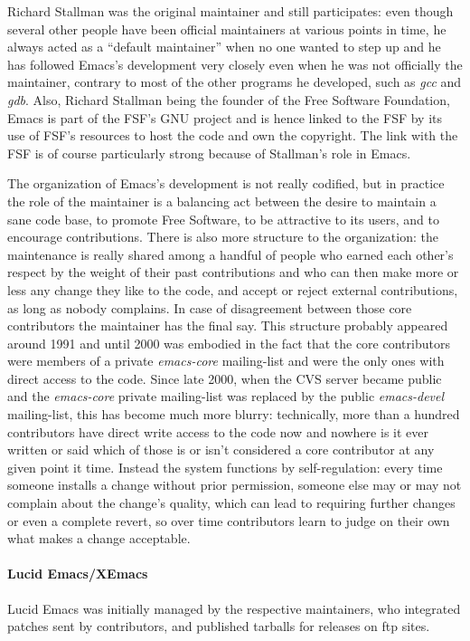 \documentclass[format=acmsmall, review]{acmart}
\begin{document}
Richard Stallman was the original maintainer and still participates: even
though several other people have been official maintainers at various points
in time, he always acted as a ``default maintainer'' when no one wanted to
step up and he has followed Emacs's development very closely even when he
was not officially the maintainer, contrary to most of the other programs he
developed, such as \emph{gcc} and \emph{gdb}.  Also, Richard Stallman being
the founder of the Free Software Foundation, Emacs is part of the FSF's GNU
project and is hence linked to the FSF by its use of FSF's resources to host
the code and own the copyright.  The link with the FSF is of course
particularly strong because of Stallman's role in Emacs.

The organization of Emacs's development is not really codified, but in
practice the role of the maintainer is a balancing act between the desire to
maintain a sane code base, to promote Free Software, to be attractive to its
users, and to encourage contributions.  There is also more structure to the
organization: the maintenance is really shared among a handful of people who
earned each other's respect by the weight of their past contributions and
who can then make more or less any change they like to the code, and accept
or reject external contributions, as long as nobody complains.  In case of
disagreement between those core contributors the maintainer has the final
say.  This structure probably appeared around 1991 and until 2000 was
embodied in the fact that the core contributors were members of a private
\emph{emacs-core} mailing-list and were the only ones with direct access to
the code.  Since late 2000, when the CVS server became public and the
\emph{emacs-core} private mailing-list was replaced by the public
\emph{emacs-devel} mailing-list, this has become much more blurry:
technically, more than a hundred contributors have direct write access to
the code now and nowhere is it ever written or said which of those is or
isn't considered a core contributor at any given point it time.  Instead the
system functions by self-regulation: every time someone installs a change
without prior permission, someone else may or may not complain about the
change's quality, which can lead to requiring further changes or even
a complete revert, so over time contributors learn to judge on their own
what makes a change acceptable.

\paragraph{Lucid Emacs/XEmacs}
Lucid Emacs was initially managed by the respective maintainers, who
integrated patches sent by contributors, and published tarballs for
releases on ftp sites.
\end{document}

